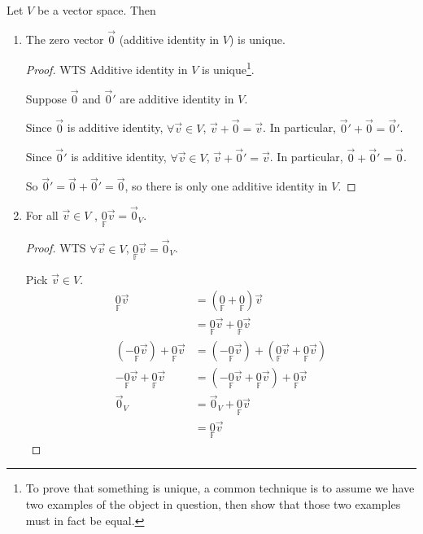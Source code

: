 \documentclass[11pt,fleqn]{book} %
\begin{document}
\setcounter{section}{1}
\setcounter{dummy}{5}
\begin{proposition}
    Let $V$ be a vector space. Then 
    
    \begin{enumerate}[label=\alph*)]
        \item The zero vector $\vec{0}$ (additive identity in $V$) is unique.
        \begin{proof}
            WTS Additive identity in $V$ is unique\footnote{To prove that something is unique, a common technique is to assume we have two examples of the object in question, then show that those two examples must in fact be equal. }.

            Suppose $\vec{0}$ and $\vec{0}'$ are additive identity in $V$. 
            
            Since $\vec{0}$ is additive identity, $\forall \vec{v} \in V$, $\vec{v} + \vec{0} = \vec{v}$. In particular, $\vec{0}' + \vec{0} = \vec{0}'$. 
            
            Since $\vec{0}'$ is additive identity, $\forall \vec{v} \in V$, $\vec{v} + \vec{0}' = \vec{v}$. In particular, $\vec{0} + \vec{0}' = \vec{0}$. 

            So $\vec{0}' = \vec{0} + \vec{0}' = \vec{0}$, so there is only one additive identity in $V$.
        \end{proof}

        \item For all $\vec{v} \in V$ , $\underset{\mathbb{F}}{0}\vec{v} = \vec{0}_V$.

        \begin{proof}
            WTS $\forall \vec{v} \in V$, $\underset{\mathbb{F}}{0}\vec{v} = \vec{0}_V$. 
            
            Pick $\vec{v} \in V$. 
            \begin{align*}
                \underset{\mathbb{F}}{0}\vec{v} 
                &= (\underset{\mathbb{F}}{0} + \underset{\mathbb{F}}{0})\vec{v} 
                \\
                &= \underset{\mathbb{F}}{0}\vec{v} + \underset{\mathbb{F}}{0}\vec{v}
                \\
                (-\underset{\mathbb{F}}{0}\vec{v}) + \underset{\mathbb{F}}{0}\vec{v}
                &= (-\underset{\mathbb{F}}{0}\vec{v}) + (\underset{\mathbb{F}}{0}\vec{v} + \underset{\mathbb{F}}{0}\vec{v})
                \\
                -\underset{\mathbb{F}}{0}\vec{v} + \underset{\mathbb{F}}{0}\vec{v}
                &= (-\underset{\mathbb{F}}{0}\vec{v} + \underset{\mathbb{F}}{0}\vec{v}) + \underset{\mathbb{F}}{0}\vec{v}
                \\
                \vec{0}_V
                &=
                \vec{0}_V + \underset{\mathbb{F}}{0}\vec{v}
                \\
                &=\underset{\mathbb{F}}{0}\vec{v}
            \end{align*}
            

\end{proof}
\end{enumerate}
\end{proposition}
\end{document}
